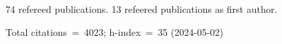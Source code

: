 74 refereed publications. 13 refeered publications as first author.

Total citations~=~4023; h-index~=~35 (2024-05-02)